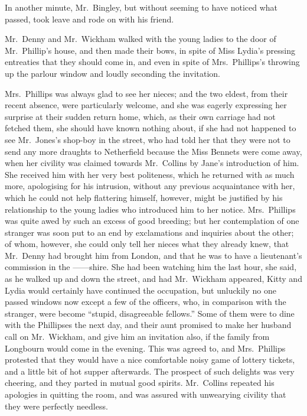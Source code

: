 \documentclass[12pt,english]{book}
\begin{document}
In another minute, Mr.\ Bingley, but without seeming to have noticed
what passed, took leave and rode on with his friend.

Mr.\ Denny and Mr.\ Wickham walked with the young ladies to the
door of Mr.\ Phillip's house, and then made their bows, in spite
of Miss Lydia's pressing entreaties that they should come in, and
even in spite of Mrs.\ Phillips's throwing up the parlour window
and loudly seconding the invitation.

Mrs.\ Phillips was always glad to see her nieces; and the two eldest,
from their recent absence, were particularly welcome, and she was
eagerly expressing her surprise at their sudden return home, which,
as their own carriage had not fetched them, she should have known
nothing about, if she had not happened to see Mr.\ Jones's shop-boy
in the street, who had told her that they were not to send any more
draughts to Netherfield because the Miss Bennets were come away, when
her civility was claimed towards Mr.\ Collins by Jane's introduction
of him. She received him with her very best politeness, which he returned
with as much more, apologising for his intrusion, without any previous
acquaintance with her, which he could not help flattering himself,
however, might be justified by his relationship to the young ladies
who introduced him to her notice. Mrs.\ Phillips was quite awed by
such an excess of good breeding; but her contemplation of one stranger
was soon put to an end by exclamations and inquiries about the other;
of whom, however, she could only tell her nieces what they already
knew, that Mr.\ Denny had brought him from London, and that he was
to have a lieutenant's commission in the \mbox{------shire.} She
had been watching him the last hour, she said, as he walked up and
down the street, and had Mr.\ Wickham appeared, Kitty and Lydia would
certainly have continued the occupation, but unluckily no one passed
windows now except a few of the officers, who, in comparison with
the stranger, were become {}``stupid, disagreeable fellows.'' Some
of them were to dine with the Phillipses the next day, and their aunt
promised to make her husband call on Mr.\ Wickham, and give him an
invitation also, if the family from Longbourn would come in the evening.
This was agreed to, and Mrs.\ Phillips protested that they would
have a nice comfortable noisy game of lottery tickets, and a little
bit of hot supper afterwards. The prospect of such delights was very
cheering, and they parted in mutual good spirits. Mr.\ Collins repeated
his apologies in quitting the room, and was assured with unwearying
civility that they were perfectly needless.
\end{document}
